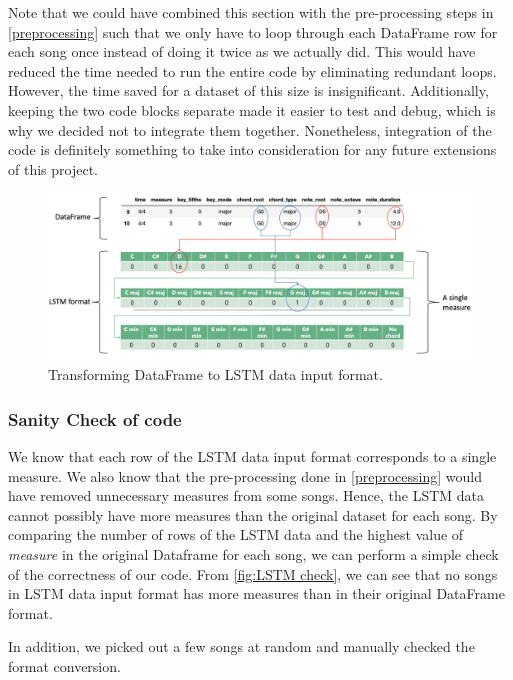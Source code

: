 Note that we could have combined this section with the pre-processing steps in \cref{preprocessing} such that we only have to loop through each DataFrame row for each song once instead of doing it twice as we actually did. This would have reduced the time needed to run the entire code by eliminating redundant loops. However, the time saved for a dataset of this size is insignificant. Additionally, keeping the two code blocks separate made it easier to test and debug, which is why we decided not to integrate them together. Nonetheless, integration of the code is definitely something to take into consideration for any future extensions of this project.
\begin{figure}
    \centering
    \includegraphics[scale=0.3]{Figures/LSTM pictorial 4}
    \decoRule
    \caption{Transforming DataFrame to LSTM data input format.}
    \label{fig:LSTM training}
    \end{figure}
    
\subsubsection{Sanity Check of code}
\label{lstm check}
We know that each row of the LSTM data input format corresponds to a single measure. We also know that the pre-processing done in \cref{preprocessing} would have removed unnecessary measures from some songs. Hence, the LSTM data cannot possibly have more measures than the original dataset for each song. By comparing the number of rows of the LSTM data and the highest value of \emph{measure} in the original Dataframe for each song, we can perform a simple check of the correctness of our code. From \cref{fig:LSTM check}, we can see that no songs in LSTM data input format has more measures than in their original DataFrame format.

In addition, we picked out a few songs at random and manually checked the format conversion.


